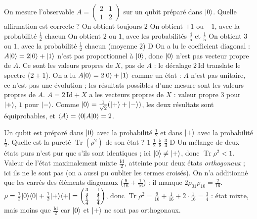   {On mesure l'observable $A=\begin{pmatrix}2&1\\1&2\end{pmatrix}$ sur un qubit préparé dans $|0\rangle$. Quelle affirmation est correcte ?}
  {On obtient toujours $2$}
  {On obtient $+1$ ou $-1$, avec la probabilité $\frac12$ chacun}
  {On obtient $2$ ou $1$, avec les probabilités $\frac45$ et $\frac15$}
  {On obtient $3$ ou $1$, avec la probabilité $\frac12$ chacun (moyenne $2$)}
  {D}
\qcmx
  {On a lu le coefficient diagonal : $A|0\rangle=2|0\rangle+|1\rangle$ n'est pas proportionnel à $|0\rangle$, donc $|0\rangle$ n'est pas vecteur propre de $A$.}
  {Ce sont les valeurs propres de $X$, pas de $A$ : le décalage $2\,\mathrm{Id}$ translate le spectre ($2\pm1$).}
  {On a lu $A|0\rangle=2|0\rangle+|1\rangle$ comme un état : $A$ n'est pas unitaire, ce n'est pas une évolution ; les résultats possibles d'une mesure sont les valeurs propres de $A$.}
  {$A=2\,\mathrm{Id}+X$ a les vecteurs propres de $X$ : valeur propre $3$ pour $|+\rangle$, $1$ pour $|-\rangle$. Comme $|0\rangle=\frac{1}{\sqrt2}(|+\rangle+|-\rangle)$, les deux résultats sont équiprobables, et $\langle A\rangle=\langle 0|A|0\rangle=2$.}

  {Un qubit est préparé dans $|0\rangle$ avec la probabilité $\frac12$ et dans $|+\rangle$ avec la probabilité $\frac12$. Quelle est la pureté $\operatorname{Tr}(\rho^2)$ de son état ?}
  {$1$}
  {$\frac12$}
  {$\frac58$}
  {$\frac34$}
  {D}
\qcmx
  {Un mélange de deux états purs n'est pur que s'ils sont identiques ; ici $|0\rangle\neq|+\rangle$, donc $\operatorname{Tr}\rho^2<1$.}
  {Valeur de l'état maximalement mixte $\frac{\mathrm{Id}}2$, atteinte pour deux états \emph{orthogonaux} ; ici ils ne le sont pas (on a aussi pu oublier les termes croisés).}
  {On n'a additionné que les carrés des éléments diagonaux ($\frac9{16}+\frac1{16}$) : il manque $2\rho_{01}\rho_{10}=\frac2{16}$.}
  {$\rho=\frac12|0\rangle\langle 0|+\frac12|+\rangle\langle +|=\begin{pmatrix}\frac34&\frac14\\\frac14&\frac14\end{pmatrix}$, donc $\operatorname{Tr}\rho^2=\frac9{16}+\frac1{16}+2\cdot\frac1{16}=\frac34$ : état mixte, mais moins que $\frac{\mathrm{Id}}2$ car $|0\rangle$ et $|+\rangle$ ne sont pas orthogonaux.}

